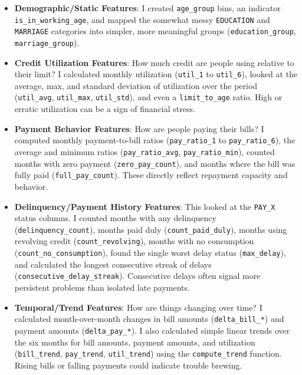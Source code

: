 \documentclass[a4paper,12pt]{article}
\begin{document}
\begin{itemize}
    \item \textbf{Demographic/Static Features}: I created \texttt{age\_group} bins, an indicator \texttt{is\_in\_working\_age}, and mapped the somewhat messy \texttt{EDUCATION} and \texttt{MARRIAGE} categories into simpler, more meaningful groups (\texttt{education\_group}, \texttt{marriage\_group}). 
    
    \item \textbf{Credit Utilization Features}: How much credit are people using relative to their limit? I calculated monthly utilization (\texttt{util\_1} to \texttt{util\_6}), looked at the average, max, and standard deviation of utilization over the period (\texttt{util\_avg}, \texttt{util\_max}, \texttt{util\_std}), and even a \texttt{limit\_to\_age} ratio. High or erratic utilization can be a sign of financial stress.
    
    \item \textbf{Payment Behavior Features}: How are people paying their bills? I computed monthly payment-to-bill ratios (\texttt{pay\_ratio\_1} to \texttt{pay\_ratio\_6}), the average and minimum ratios (\texttt{pay\_ratio\_avg}, \texttt{pay\_ratio\_min}), counted months with zero payment (\texttt{zero\_pay\_count}), and months where the bill was fully paid (\texttt{full\_pay\_count}). These directly reflect repayment capacity and behavior.
    
    \item \textbf{Delinquency/Payment History Features}: This looked at the \texttt{PAY\_X} status columns. I counted months with any delinquency (\texttt{delinquency\_count}), months paid duly (\texttt{count\_paid\_duly}), months using revolving credit (\texttt{count\_revolving}), months with no consumption (\texttt{count\_no\_consumption}), found the single worst delay status (\texttt{max\_delay}), and calculated the longest consecutive streak of delays (\texttt{consecutive\_delay\_streak}). Consecutive delays often signal more persistent problems than isolated late payments.
    
    \item \textbf{Temporal/Trend Features}: How are things changing over time? I calculated month-over-month changes in bill amounts (\texttt{delta\_bill\_*}) and payment amounts (\texttt{delta\_pay\_*}). I also calculated simple linear trends over the six months for bill amounts, payment amounts, and utilization (\texttt{bill\_trend}, \texttt{pay\_trend}, \texttt{util\_trend}) using the \texttt{compute\_trend} function. Rising bills or falling payments could indicate trouble brewing.
    

\end{itemize}
\end{document}
